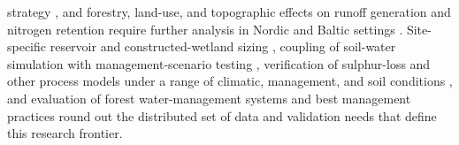 \documentclass[11pt]{article}
\begin{document}
strategy \parencite{ElAgha2020}, and forestry, land-use, and topographic effects on
runoff generation and nitrogen retention require further analysis in Nordic and
Baltic settings \parencite{Deelstra2014,Deelstra2014b}. Site-specific reservoir and
constructed-wetland sizing \parencite{Haverstock2017}, coupling of soil-water
simulation with management-scenario testing \parencite{Bulot2017}, verification of
sulphur-loss and other process models under a range of climatic, management, and
soil conditions \parencite{SMITH1983}, and evaluation of forest water-management
systems and best management practices \parencite{MCCARTHY1992} round out the
distributed set of data and validation needs that define this research frontier.

\printbibliography
\end{document}
